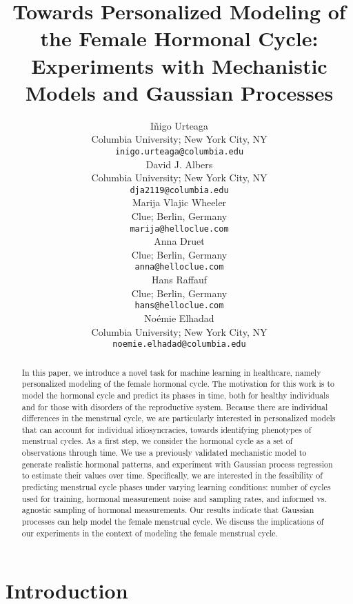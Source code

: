 \documentclass{article}
\title{Towards Personalized Modeling of the Female Hormonal Cycle: Experiments with Mechanistic Models and Gaussian Processes}
\author{
        I\~{n}igo Urteaga \\
        Columbia University; New York City, NY\\
        \texttt{inigo.urteaga@columbia.edu} \\
        \And
        David J. Albers \\
        Columbia University; New York City, NY \\
        \texttt{dja2119@columbia.edu} \\
        \And    
        Marija Vlajic Wheeler \\
        Clue; Berlin, Germany \\
        \texttt{marija@helloclue.com}\\
        \And
        Anna Druet \\
        Clue; Berlin, Germany \\
        \texttt{anna@helloclue.com} \\
        \And
        Hans Raffauf \\
        Clue; Berlin, Germany \\
        \texttt{hans@helloclue.com} \\
        \And
        No\'{e}mie Elhadad \\
        Columbia University; New York City, NY \\
        \texttt{noemie.elhadad@columbia.edu}
}
\begin{document}
\maketitle

\begin{abstract}
In this paper, we introduce a novel task for machine learning in healthcare, namely personalized modeling of the female hormonal cycle. The motivation for this work is to model the hormonal cycle and predict its phases in time, both for healthy individuals and for those with disorders of the reproductive system. Because there are individual differences in the menstrual cycle, we are particularly interested in personalized models that can account for individual idiosyncracies, towards identifying phenotypes of menstrual cycles. As a first step, we consider the hormonal cycle as a set of observations through time. We use a previously validated mechanistic model to generate realistic hormonal patterns, and experiment with Gaussian process regression to estimate their values over time. Specifically, we are interested in the feasibility of predicting menstrual cycle phases under varying learning conditions: number of cycles used for training, hormonal measurement noise and sampling rates, and informed vs. agnostic sampling of hormonal measurements. Our results indicate that Gaussian processes can help model the female menstrual cycle. We discuss the implications of our experiments in the context of modeling the female menstrual cycle. 
\end{abstract}

\section{Introduction}
\label{sec:intro}
\end{document}
